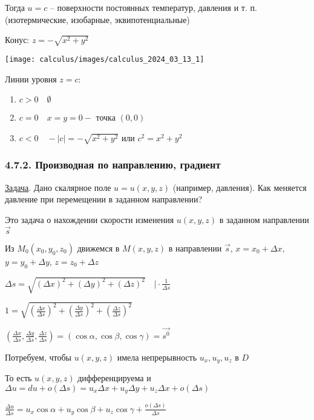 \documentclass[12pt]{article}
\begin{document}
    Тогда $u = c$ -- поверхности постоянных температур, давления и т. п. (изотермические, изобарные, эквипотенциальные)

    \Ex Конус: $z = -\sqrt{x^2 + y^2}$

    \texttt{[image: calculus/images/calculus\_2024\_03\_13\_1]}

    Линии уровня $z = c$:

    \begin{enumerate}
        \item $c > 0 \quad \emptyset$
        \item $c = 0 \quad x = y = 0 - $ точка $(0, 0)$
        \item $c < 0 \quad -|c| = -\sqrt{x^2 + y^2} \text{ или } c^2 = x^2 + y^2$
    \end{enumerate}


    \subsubsection{4.7.2. Производная по направлению, градиент}

    \underline{Задача}. Дано скалярное поле $u = u(x, y, z)$ (например, давления). Как меняется давление при перемещении в заданном направлении?

    Это задача о нахождении скорости изменения $u(x, y, z)$ в заданном направлении $\vec{s}$

    Из $M_0(x_0, y_0, z_0)$ движемся в $M(x, y, z)$ в направлении $\vec{s}$, $x = x_0 + \Delta x$, $y = y_0 + \Delta y$, $z = z_0 + \Delta z$

    $\Delta s = \sqrt{(\Delta x)^2 + (\Delta y)^2 + (\Delta z)^2} \quad \Big| \cdot \frac{1}{\Delta s}$

    $1 = \sqrt{\left(\frac{\Delta x}{\Delta s}\right)^2 + \left(\frac{\Delta y}{\Delta s}\right)^2 + \left(\frac{\Delta z}{\Delta s}\right)^2}$

    $\left(\frac{\Delta x}{\Delta s}, \frac{\Delta y}{\Delta s}, \frac{\Delta z}{\Delta s}\right) = (\cos\alpha, \cos\beta, \cos\gamma) = \vec{s^0}$

    Потребуем, чтобы $u(x, y, z)$ имела непрерывность $u_x, u_y, u_z$ в $D$

    То есть $u(x, y, z)$ дифференцируема и
    $\Delta u = du + o(\Delta s) = u_x \Delta x + u_y \Delta y + u_z \Delta x + o(\Delta s)$

    $\frac{\Delta u}{\Delta s} = u_x \cos\alpha + u_y \cos\beta + u_z \cos\gamma + \frac{o(\Delta s)}{\Delta s}$
\end{document}
